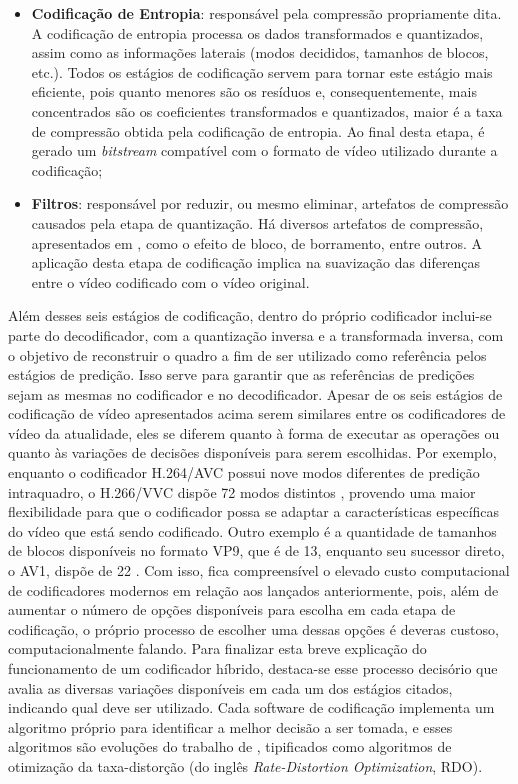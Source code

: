 \begin{itemize}
    \item \textbf{Codificação de Entropia}: responsável pela compressão propriamente dita. A codificação de entropia processa os dados transformados e quantizados, assim como as informações laterais (modos decididos, tamanhos de blocos, etc.). Todos os estágios de codificação servem para tornar este estágio mais eficiente, pois quanto menores são os resíduos e, consequentemente, mais concentrados são os coeficientes transformados e quantizados, maior é a taxa de compressão obtida pela codificação de entropia. Ao final desta etapa, é gerado um \textit{bitstream} compatível com o formato de vídeo utilizado durante a codificação;

    \item \textbf{Filtros}: responsável por reduzir, ou mesmo eliminar, artefatos de compressão causados pela etapa de quantização. Há diversos artefatos de compressão, apresentados em \citet{bib:quantization_artifacts}, como o efeito de bloco, de borramento, entre outros. A aplicação desta etapa de codificação implica na suavização das diferenças entre o vídeo codificado com o vídeo original.

\end{itemize}

Além desses seis estágios de codificação, dentro do próprio codificador inclui-se parte do decodificador, com a quantização inversa e a transformada inversa, com o objetivo de reconstruir o quadro a fim de ser utilizado como referência pelos estágios de predição. Isso serve para garantir que as referências de predições sejam as mesmas no codificador e no decodificador. Apesar de os seis estágios de codificação de vídeo apresentados acima serem similares entre os codificadores de vídeo da atualidade, eles se diferem quanto à forma de executar as operações ou quanto às variações de decisões disponíveis para serem escolhidas. Por exemplo, enquanto o codificador H.264/AVC possui nove modos diferentes de predição intraquadro, o H.266/VVC dispõe 72 modos distintos \cite{bib:vvc_intra_modes}, provendo uma maior flexibilidade para que o codificador possa se adaptar a características específicas do vídeo que está sendo codificado. Outro exemplo é a quantidade de tamanhos de blocos disponíveis no formato VP9, que é de 13, enquanto seu sucessor direto, o AV1, dispõe de 22 \cite{bib:av1_overview_2021}. Com isso, fica compreensível o elevado custo computacional de codificadores modernos em relação aos lançados anteriormente, pois, além de aumentar o número de opções disponíveis para escolha em cada etapa de codificação, o próprio processo de escolher uma dessas opções é deveras custoso, computacionalmente falando. Para finalizar esta breve explicação do funcionamento de um codificador híbrido, destaca-se esse processo decisório que avalia as diversas variações disponíveis em cada um dos estágios citados, indicando qual deve ser utilizado. Cada software de codificação implementa um algoritmo próprio para identificar a melhor decisão a ser tomada, e esses algoritmos são evoluções do trabalho de \citet{bib:rdo_sullivan}, tipificados como algoritmos de otimização da taxa-distorção (do inglês \textit{Rate-Distortion Optimization}, RDO).

